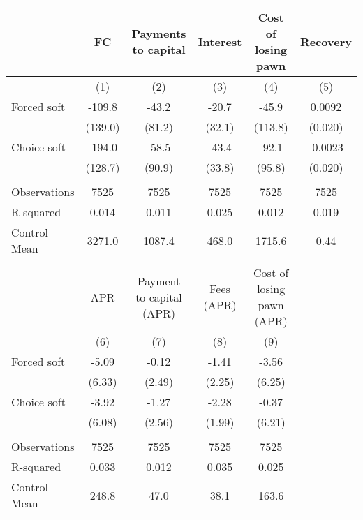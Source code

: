 \begin{tabular}{lccccc}
\toprule
      & FC    & Payments to capital & Interest & Cost of losing pawn & Recovery \\
\midrule
      & (1)   & (2)   & (3)   & (4)   & (5) \\
\midrule
\midrule
Forced soft & -109.8 & -43.2 & -20.7 & -45.9 & 0.0092 \\
      & (139.0) & (81.2) & (32.1) & (113.8) & (0.020) \\
Choice soft & -194.0 & -58.5 & -43.4 & -92.1 & -0.0023 \\
      & (128.7) & (90.9) & (33.8) & (95.8) & (0.020) \\
      &       &       &       &       &  \\
\midrule
Observations & 7525  & 7525  & 7525  & 7525  & 7525 \\
R-squared & 0.014 & 0.011 & 0.025 & 0.012 & 0.019 \\
Control Mean & 3271.0 & 1087.4 & 468.0 & 1715.6 & 0.44 \\
\midrule
\midrule
      &       &       &       &       &  \\
\midrule
      & APR   & Payment to capital (APR) & Fees (APR) & Cost of losing pawn (APR) &  \\
\midrule
      & (6)   & (7)   & (8)   & (9)   &  \\
\midrule
\midrule
Forced soft & -5.09 & -0.12 & -1.41 & -3.56 &  \\
      & (6.33) & (2.49) & (2.25) & (6.25) &  \\
Choice soft & -3.92 & -1.27 & -2.28 & -0.37 &  \\
      & (6.08) & (2.56) & (1.99) & (6.21) &  \\
      &       &       &       &       &  \\
\midrule
Observations & 7525  & 7525  & 7525  & 7525  &  \\
R-squared & 0.033 & 0.012 & 0.035 & 0.025 &  \\
Control Mean & 248.8 & 47.0  & 38.1  & 163.6 &  \\
\bottomrule
\bottomrule
\end{tabular}%
